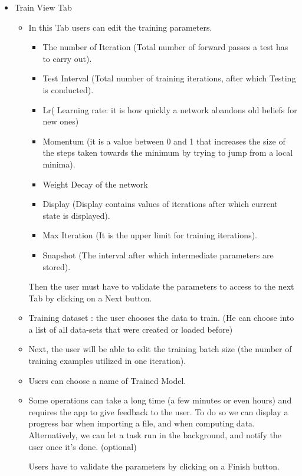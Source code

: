 \begin{itemize}
\begin{itemize}
   \end{itemize}
   \item Train View Tab
   \begin{itemize}
   \item In this Tab users can edit the training parameters.
    \begin{itemize}
        \item The number of Iteration (Total number of forward passes a test has to carry out).
        \item Test Interval (Total number of training iterations, after which Testing is conducted).
        \item Lr( Learning rate: it is how quickly a network abandons old beliefs for new ones)
        \item Momentum (it is a value between 0 and 1 that increases the size of the steps taken towards the minimum by trying to jump from a local minima).
        \item Weight Decay of the network
        \item Display (Display contains values of iterations after which current state is displayed).
        \item Max Iteration (It is the upper limit for training iterations).
        \item Snapshot (The interval after which intermediate parameters are stored).
    \end{itemize}
    Then the user must have to validate the parameters to access to the next Tab by clicking on a Next button.
    \item Training dataset : the user chooses the data to train. (He can choose into a list of all data-sets that were created or loaded before)
    \item Next, the user will be able to edit the training batch size (the number of training examples utilized in one iteration).
    \item Users can choose a name of Trained Model.
    \item Some operations can take a long time (a few minutes or even hours) and requires the app to give feedback to the user. To do so we can display a progress bar when importing a file, and when computing data.  Alternatively, we can let a task run in the background, and notify the user once it's done. (optional)
    
    Users have to validate the parameters by clicking on a Finish button.
   \end{itemize}
   

\end{itemize}
